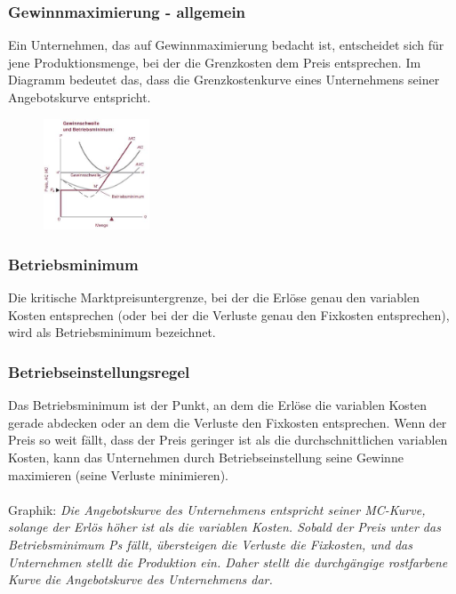 \documentclass[10pt]{scrartcl}
\begin{document}
\subsubsection{Gewinnmaximierung - allgemein}
Ein Unternehmen, das auf Gewinnmaximierung bedacht ist, entscheidet sich für jene Produktionsmenge, bei der die Grenzkosten dem Preis entsprechen. Im Diagramm bedeutet das, dass die Grenzkostenkurve eines Unternehmens seiner Angebotskurve entspricht.\\
\begin{figure}
  \begin{center}
    \includegraphics[width=0.28\textwidth]{img/betriebsminimum.jpg}
    \vspace{-20pt}
    \end{center}
\end{figure}
\subsubsection{Betriebsminimum}
Die kritische Marktpreisuntergrenze, bei der die Erlöse genau den variablen Kosten entsprechen (oder bei der die Verluste genau den Fixkosten entsprechen), wird als Betriebsminimum bezeichnet.
\subsubsection{Betriebseinstellungsregel}
 Das Betriebsminimum ist der Punkt, an dem die Erlöse die variablen Kosten gerade abdecken oder an dem die Verluste den Fixkosten entsprechen. Wenn der Preis so weit fällt, dass der Preis geringer ist als die durchschnittlichen variablen Kosten, kann das Unternehmen durch Betriebseinstellung seine Gewinne maximieren (seine Verluste minimieren).\\
 \\
Graphik: {\it Die Angebotskurve des Unternehmens entspricht seiner MC-Kurve, solange der Erlös höher ist als die variablen Kosten. Sobald der Preis unter das Betriebsminimum Ps fällt, übersteigen die Verluste die Fixkosten, und das Unternehmen stellt die Produktion ein. Daher stellt die durchgängige rostfarbene Kurve die Angebotskurve des Unternehmens dar.}
\end{document}
